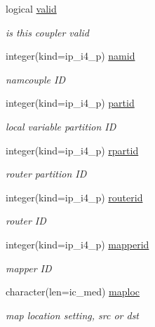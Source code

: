 \begin{DoxyCompactItemize}
logical \hyperlink{structmod__oasis__coupler_1_1prism__coupler__type_aceee78ca0ec709406b404ff29e1fcf18}{valid}
\begin{DoxyCompactList}\small\item\em is this coupler valid \end{DoxyCompactList}\item 
integer(kind=ip\+\_\+i4\+\_\+p) \hyperlink{structmod__oasis__coupler_1_1prism__coupler__type_a68ccbd8305f8c1016a9025558ab8dea5}{namid}
\begin{DoxyCompactList}\small\item\em namcouple I\+D \end{DoxyCompactList}\item 
integer(kind=ip\+\_\+i4\+\_\+p) \hyperlink{structmod__oasis__coupler_1_1prism__coupler__type_a5506dc46a0c8def7417a6e2a9c046474}{partid}
\begin{DoxyCompactList}\small\item\em local variable partition I\+D \end{DoxyCompactList}\item 
integer(kind=ip\+\_\+i4\+\_\+p) \hyperlink{structmod__oasis__coupler_1_1prism__coupler__type_a1bf4a986a745318b93d46612b95b0489}{rpartid}
\begin{DoxyCompactList}\small\item\em router partition I\+D \end{DoxyCompactList}\item 
integer(kind=ip\+\_\+i4\+\_\+p) \hyperlink{structmod__oasis__coupler_1_1prism__coupler__type_ab6ce21d836e3fc511fcb028f99b0abd7}{routerid}
\begin{DoxyCompactList}\small\item\em router I\+D \end{DoxyCompactList}\item 
integer(kind=ip\+\_\+i4\+\_\+p) \hyperlink{structmod__oasis__coupler_1_1prism__coupler__type_ada880a13e931db47e72859515208ec1d}{mapperid}
\begin{DoxyCompactList}\small\item\em mapper I\+D \end{DoxyCompactList}\item 
character(len=ic\+\_\+med) \hyperlink{structmod__oasis__coupler_1_1prism__coupler__type_aab6763e489b8ace8cff0fbe9e62cbcd8}{maploc}
\begin{DoxyCompactList}\small\item\em map location setting, src or dst \end{DoxyCompactList}\item 

\end{DoxyCompactItemize}
